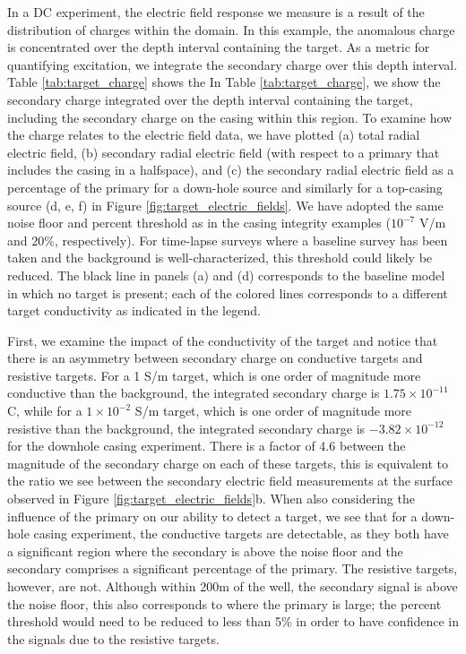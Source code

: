 


In a DC experiment, the electric field response we measure is a result of the distribution of charges within the domain. In this example, the anomalous charge is concentrated over the depth interval containing the target. As a metric for quantifying excitation, we integrate the secondary charge over this depth interval. Table \ref{tab:target_charge} shows the In Table \ref{tab:target_charge}, we show the secondary charge integrated over the depth interval containing the target, including the secondary charge on the casing within this region. To examine how the charge relates to the electric field data, we have plotted (a) total radial electric field, (b) secondary radial electric field (with respect to a primary that includes the casing in a halfspace), and (c) the secondary radial electric field as a percentage of the primary for a down-hole source and similarly for a top-casing source (d, e, f) in Figure \ref{fig:target_electric_fields}. We have adopted the same noise floor and percent threshold as in the casing integrity examples ($10^{-7}$ V/m and $20\%$, respectively). For time-lapse surveys where a baseline survey has been taken and the background is well-characterized, this threshold could likely be reduced. The black line in panels (a) and (d) corresponds to the baseline model in which no target is present; each of the colored lines corresponds to a different target conductivity as indicated in the legend.









First, we examine the impact of the conductivity of the target and notice that there is an asymmetry between secondary charge on conductive targets and resistive targets. For a 1 S/m target, which is one order of magnitude more conductive than the background, the integrated secondary charge is $1.75 \times 10^{-11}$ C, while for a $1\times10^{-2}$ S/m target, which is one order of magnitude more resistive than the background, the integrated secondary charge is $-3.82 \times 10^{-12}$ for the downhole casing experiment. There is a factor of 4.6 between the magnitude of the secondary charge on each of these targets, this is equivalent to the ratio we see between the secondary electric field measurements at the surface observed in Figure \ref{fig:target_electric_fields}b. When also considering the influence of the primary on our ability to detect a target, we see that for a down-hole casing experiment, the conductive targets are detectable, as they both have a significant region where the secondary is above the noise floor and the secondary comprises a significant percentage of the primary. The resistive targets, however, are not. Although within 200m of the well, the secondary signal is above the noise floor, this also corresponds to where the primary is large; the percent threshold would need to be reduced to less than 5\% in order to have confidence in the signals due to the resistive targets.

